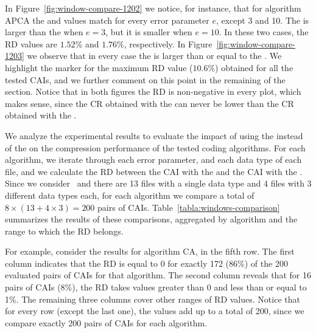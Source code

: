 In Figure~\ref{fig:window-compare-1202} we notice, for instance, that for algorithm APCA the \ows and \lows values match for every error parameter $e$, except 3 and 10. The \ows is larger than the \lows when $e=3$, but it is smaller when $e=10$. In these two cases, the RD values are $1.52\%$ and $1.76\%$, respectively. In Figure~\ref{fig:window-compare-1203} we observe that in every case the \ows is larger than or equal to the \lows. We highlight the marker for the maximum RD value ($10.6\%$) obtained for all the tested CAIs, and we further comment on this point in the remaining of the section. Notice that in both figures the RD is non-negative in every plot, which makes sense, since the CR obtained with the \ows can never be lower than the CR obtained with the \lows.

\clearpage


\clearpage


We analyze the experimental results to evaluate the impact of using the \ows instead of the \lows on the compression performance of the tested coding algorithms. For each algorithm, we iterate through each error parameter, and each data type of each file, and we calculate the RD between the CAI with the \ows and the CAI with the \lows. Since we consider \errParVal\ and there are 13 files with a single data type and 4 files with 3 different data types each, for each algorithm we compare a total of $8 \times (13 + 4\times3) = 200$ pairs of CAIs. Table~\ref{tabla:windows-comparison} summarizes the results of these comparisons, aggregated by algorithm and the range to which the RD belongs. 


\vspace{+5pt}

\vspace{-5pt}


For example, consider the results for algorithm CA, in the fifth row. The first column indicates that the RD is equal to 0 for exactly 172 (86\%) of the 200 evaluated pairs of CAIs for that algorithm. The second column reveals that for 16 pairs of CAIs (8\%), the RD takes values greater than 0 and less than or equal to 1\%. The remaining three columns cover other ranges of RD values. Notice that for every row (except the last one), the values add up to a total of 200, since we compare exactly 200 pairs of CAIs for each algorithm.


